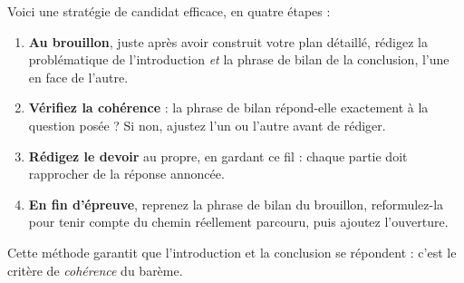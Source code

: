 \documentclass[11pt]{article}
\begin{document}
\begin{methode}
Voici une stratégie de candidat efficace, en quatre étapes :
\begin{enumerate}
\item \textbf{Au brouillon}, juste après avoir construit votre plan détaillé, rédigez la problématique de l'introduction \emph{et} la phrase de bilan de la conclusion, l'une en face de l'autre.
\item \textbf{Vérifiez la cohérence} : la phrase de bilan répond-elle exactement à la question posée ? Si non, ajustez l'un ou l'autre avant de rédiger.
\item \textbf{Rédigez le devoir} au propre, en gardant ce fil : chaque partie doit rapprocher de la réponse annoncée.
\item \textbf{En fin d'épreuve}, reprenez la phrase de bilan du brouillon, reformulez-la pour tenir compte du chemin réellement parcouru, puis ajoutez l'ouverture.
\end{enumerate}
Cette méthode garantit que l'introduction et la conclusion se répondent : c'est le critère de \emph{cohérence} du barème.
\end{methode}
\end{document}
